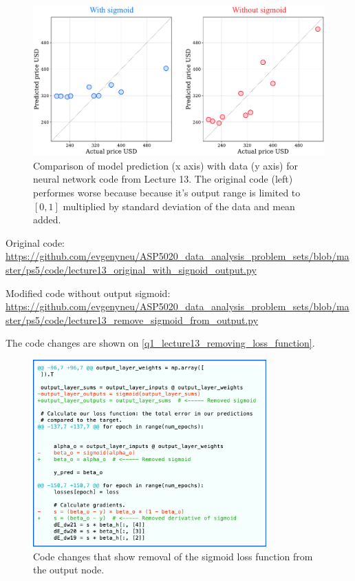 \begin{figure}[!ht]
  \centering
  \includegraphics[width=1\textwidth]{figures/lecture13_results_compared.pdf}
  \caption{Comparison of model prediction (x axis) with data (y axis) for neural network code from Lecture 13. The original code (left) performes worse because because it's output range is limited to $[0, 1]$ multiplied by standard deviation of the data and mean added.}
  \label{q1_lecture13_data_prediction_compare}
\end{figure}



Original code: \\ \url{https://github.com/evgenyneu/ASP5020_data_analysis_problem_sets/blob/master/ps5/code/lecture13_original_with_signoid_output.py}

Modified code without output sigmoid: \\ \url{https://github.com/evgenyneu/ASP5020_data_analysis_problem_sets/blob/master/ps5/code/lecture13_remove_sigmoid_from_output.py}

The code changes are shown on \autoref{q1_lecture13_removing_loss_function}.


\begin{figure}[!ht]
  \centering
  \includegraphics[width=0.8\textwidth]{figures/q1_lecture13_code_changes.png}
  \caption{Code changes that show removal of the sigmoid loss function from the output node.}
  \label{q1_lecture13_removing_loss_function}
\end{figure}







